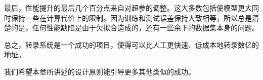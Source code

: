 最后，性能提升的最后几个百分点来自对超参的调整。这大多数包括使模型更大同时保持一些在计算代价上的限制。因为训练和测试误差保持大致相等，所以总是清楚的是，任何性能缺陷是由于欠拟合造成的，还有一些余下的数据集本身的问题。

总之，转录系统是一个成功的项目，使得可以比人工更快速、低成本地转录数亿的地址。

我们希望本章所讲述的设计原则能引导更多其他类似的成功。

